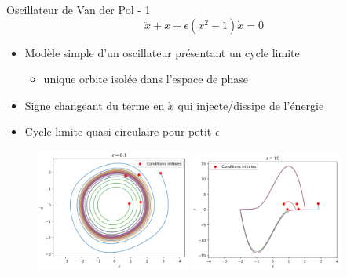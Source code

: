 
\begin{frame}{Oscillateur de Van der Pol - 1}
    $$ \ddot{x}  +  x + \epsilon(x^2 - 1)\dot{x} = 0 $$
    \begin{itemize}
        \item Modèle simple d'un oscillateur présentant un cycle limite
        \begin{itemize}
            \item unique orbite isolée dans l'espace de phase
        \end{itemize}
        \item Signe changeant du terme en $\dot{x}$ qui injecte/dissipe de l'énergie
        \item Cycle limite quasi-circulaire pour petit $\epsilon$
    \end{itemize}

    \begin{figure}
        \includegraphics[width=0.45\textwidth]{images/vdp/vanderpol_small.png}
        \includegraphics[width=0.45\textwidth]{images/vdp/vanderpol_large.png}
    \end{figure}

\end{frame}

